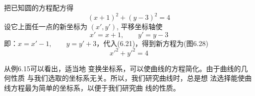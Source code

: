 \begin{solution}
    把已知圆的方程配方得
\begin{equation}
    (x+1)^2+(y-3)^2=4
\end{equation}
设它上面任一点的新坐标为
$(x',y')$, 平移坐标轴使
\[x'=x+1,\qquad y'=y-3\]
即：$x=x'-1,\qquad y=y'+3$，代入(6.21)，得到新方程为(图6.28)
\[{x'}^2+{y'}^2=4\]
\end{solution}

从例6.15可以看出，适当地
变换坐标系，可以使曲线的方程简化。由于曲线的几何性质
与我们选取的坐标系无关。所以，我们研究曲线时，总是想
法选择能使曲线方程最为简单的坐标系，以便于我们研究曲
线的性质。

\begin{example}
    
\end{example}



\begin{solution}
    
\end{solution}





\begin{example}
    
\end{example}



\begin{solution}
    
\end{solution}

\begin{example}
    
\end{example}



\begin{solution}
    
\end{solution}







\begin{example}
    
\end{example}



\begin{solution}
    
\end{solution}

